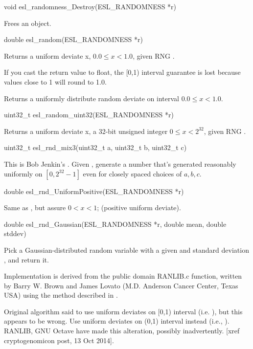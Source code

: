 \begin{sreapi}
\hypertarget{func:esl_randomness_Destroy()}
{\item[void esl\_randomness\_Destroy(ESL\_RANDOMNESS *r)]}

Frees an  object.


\hypertarget{func:esl_random()}
{\item[double esl\_random(ESL\_RANDOMNESS *r)]}

Returns a uniform deviate x, $0.0 \leq x < 1.0$, given
RNG .

If you cast the return value to float, the [0,1) interval
guarantee is lost because values close to 1 will round to
1.0.

Returns a uniformly distribute random deviate on interval
$0.0 \leq x < 1.0$.


\hypertarget{func:esl_random_uint32()}
{\item[uint32\_t esl\_random\_uint32(ESL\_RANDOMNESS *r)]}

Returns a uniform deviate x, a 32-bit unsigned
integer $0 \leq x < 2^{32}$, given RNG .


\hypertarget{func:esl_rnd_mix3()}
{\item[uint32\_t esl\_rnd\_mix3(uint32\_t a, uint32\_t b, uint32\_t c)]}

This is Bob Jenkin's . Given ,
generate a number that's generated reasonably
uniformly on $[0,2^{32}-1]$ even for closely
spaced choices of $a,b,c$. 


\hypertarget{func:esl_rnd_UniformPositive()}
{\item[double esl\_rnd\_UniformPositive(ESL\_RANDOMNESS *r)]}

Same as , but assure $0 < x < 1$;
(positive uniform deviate).


\hypertarget{func:esl_rnd_Gaussian()}
{\item[double esl\_rnd\_Gaussian(ESL\_RANDOMNESS *r, double mean, double stddev)]}

Pick a Gaussian-distributed random variable
with a given  and standard deviation , and
return it. 

Implementation is derived from the public domain
RANLIB.c  function, written by Barry W. Brown
and James Lovato (M.D. Anderson Cancer Center, Texas
USA) using the method described in
\citep{AhrensDieter73}.

Original algorithm said to use uniform deviates on [0,1)
interval (i.e. ), but this appears to be
wrong.  Use uniform deviates on (0,1) interval instead
(i.e., ). RANLIB, GNU Octave
have made this alteration, possibly inadvertently.
[xref cryptogenomicon post, 13 Oct 2014].




\end{sreapi}
